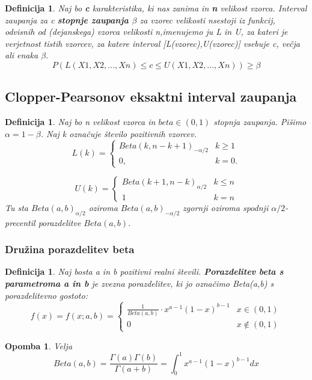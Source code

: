 \documentclass[11pt]{article}
\newtheorem{Definicija}[Izrek]{{\sc Definicija}}
\newtheorem{Opomba}[Izrek]{{\sc Opomba}}
\begin{document}
\begin{Definicija}
Naj bo \textbf{c} karakteristika, ki nas zanima in
\textbf{n} velikost vzorca.
Interval zaupanja za c \textbf{stopnje zaupanja $\beta$} za vzorec velikosti nsestoji iz funkcij, odvisnih od (dejanskega) vzorca velikosti n,imenujemo ju L in U, za kateri je verjetnost tistih vzorcev, za
katere interval [L(vzorec),U(vzorec)] vsebuje c, večja ali enaka $\beta$.
$$	P(L(X1, X2, . . . , Xn) \le c \le U(X1, X2, . . . , Xn))
\ge \beta$$
\end{Definicija}
\subsection{Clopper-Pearsonov eksaktni interval zaupanja}

\begin{Definicija}
	Naj bo n velikost vzorca in $beta \in (0,1)$ stopnja zaupanja. Pišimo $\alpha = 1 - \beta$. Naj k označuje število pozitivnih vzorcev.
	\[
	L(k)= 
	\begin{cases}
	Beta(k, n-k+1)_{-\alpha/2} & k\ge 1\\
	0,              & k = 0.
	\end{cases}
	\]

	\[
	U(k)= 
	\begin{cases}
	Beta(k+1, n-k)_{\alpha/2}& k\le n\\
	1             & k=n
	\end{cases}
	\]
	Tu sta $Beta(a,b)_{\alpha/2}$ oziroma $Beta(a,b)_{-\alpha/2}$ zgornji oziroma spodnji $\alpha/2$-precentil porazdelitve $Beta(a,b)$.
\end{Definicija}
\subsubsection{Družina porazdelitev beta}
\begin{Definicija}
	Naj bosta a in b pozitivni realni števili. \textbf{Porazdelitev beta s parametroma a in b} je zvezna porazdelitev, ki jo označimo Beta(a,b) s porazdelitevno gostoto:
	\[
	f(x) = f(x;a,b) = 
	\begin{cases}
	\frac{1}{Beta(a,b)} \cdot x^{a-1} (1-x)^{b-1}& x\in(0,1)\\
	0   & x\notin (0,1)
	\end{cases}
	\]
\end{Definicija}
\begin{Opomba}
	Velja $$Beta(a,b) = \frac{\Gamma(a) \Gamma(b)}{\Gamma(a+b)} = \int_{0}^{1}{x^{a-1}(1-x)^{b-1}dx}$$
\end{Opomba}
\end{document}
